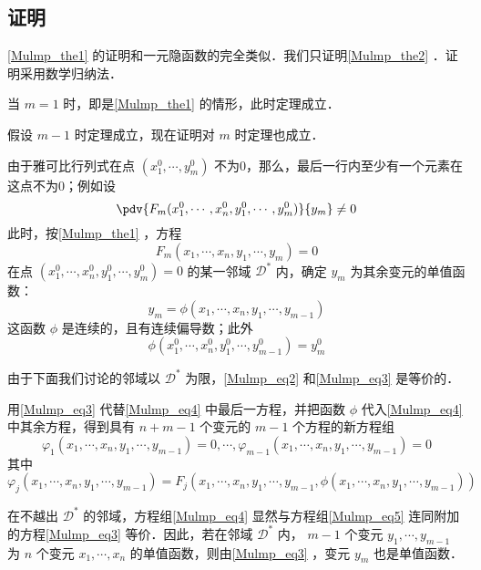 \subsection{证明}
\autoref{Mulmp_the1} 的证明和一元隐函数的完全类似．我们只证明\autoref{Mulmp_the2} ．证明采用数学归纳法．

当 $m=1$ 时，即是\autoref{Mulmp_the1} 的情形，此时定理成立．

假设 $m-1$ 时定理成立，现在证明对 $m$ 时定理也成立．

由于雅可比行列式在点 $(x_1^0,\cdots,y_m^0)$ 不为0，那么，最后一行内至少有一个元素在这点不为0；例如设
\begin{equation}
\pdv{F_m(x_1^0,\cdots,x_n^0,y_1^0,\cdots,y_m^0)}{y_m}\neq0
\end{equation}
此时，按\autoref{Mulmp_the1} ，方程
\begin{equation}\label{Mulmp_eq2}
F_m(x_1,\cdots,x_n,y_1,\cdots,y_m)=0
\end{equation}
在点 $(x_1^0,\cdots,x_n^0,y_1^0,\cdots,y_m^0)=0$ 的某一邻域 $\mathcal{D}^*$ 内，确定 $y_m$ 为其余变元的单值函数：
\begin{equation}\label{Mulmp_eq3}
y_m=\phi(x_1,\cdots,x_n,y_1,\cdots,y_{m-1})
\end{equation}
这函数 $\phi$ 是连续的，且有连续偏导数；此外
\begin{equation}
\phi(x_1^0,\cdots,x_n^0,y_1^0,\cdots,y_{m-1}^0)=y_m^0
\end{equation}

由于下面我们讨论的邻域以 $\mathcal{D}^*$ 为限，\autoref{Mulmp_eq2} 和\autoref{Mulmp_eq3} 是等价的．

用\autoref{Mulmp_eq3} 代替\autoref{Mulmp_eq4} 中最后一方程，并把函数 $\phi$ 代入\autoref{Mulmp_eq4} 中其余方程，得到具有 $n+m-1$ 个变元的 $m-1$ 个方程的新方程组
\begin{equation}\label{Mulmp_eq5}
\varphi_1(x_1,\cdots,x_n,y_1,\cdots,y_{m-1})=0,\cdots,\varphi_{m-1}(x_1,\cdots,x_n,y_1,\cdots,y_{m-1})=0
\end{equation}
其中
\begin{equation}\varphi_j(x_1,\cdots,x_n,y_1,\cdots,y_{m-1})=F_j(x_1,\cdots,x_n,y_1,\cdots,y_{m-1},\phi(x_1,\cdots,x_n,y_1,\cdots,y_{m-1}))
\end{equation}

在不越出 $\mathcal{D}^*$ 的邻域，方程组\autoref{Mulmp_eq4} 显然与方程组\autoref{Mulmp_eq5} 连同附加的方程\autoref{Mulmp_eq3} 等价．因此，若在邻域 $\mathcal{D}^*$ 内， $m-1$ 个变元 $y_1,\cdots,y_{m-1}$ 为 $n$ 个变元 $x_1,\cdots,x_n$ 的单值函数，则由\autoref{Mulmp_eq3} ，变元 $y_m$ 也是单值函数．